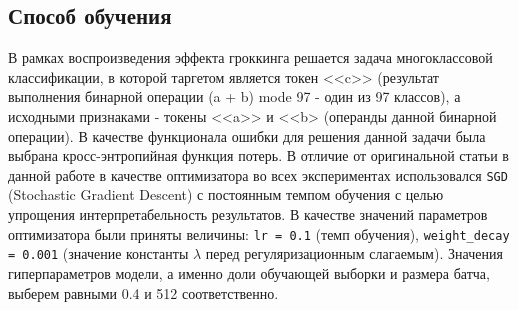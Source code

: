 \documentclass{article}
\begin{document}
\subsection{Способ обучения}
В рамках воспроизведения эффекта гроккинга решается задача многоклассовой классификации, в которой таргетом является токен <<c>> (результат выполнения бинарной операции (a + b) mode 97 - один из 97 классов), а исходными признаками - токены <<a>> и <<b> (операнды данной бинарной операции). В качестве функционала ошибки для решения данной задачи была выбрана кросс-энтропийная функция потерь.
В отличие от оригинальной статьи в данной работе в качестве оптимизатора во всех экспериментах использовался \verb|SGD| (Stochastic Gradient Descent) \cite{lion} с постоянным темпом обучения с целью упрощения интерпретабельность результатов. В качестве значений параметров оптимизатора были приняты величины: \verb|lr = 0.1| (темп обучения), \verb|weight_decay = 0.001| (значение константы $\lambda$ перед регуляризационным слагаемым). Значения гиперпараметров модели, а именно доли обучающей выборки и размера батча, выберем равными 0.4 и 512 соответственно.
\end{document}
